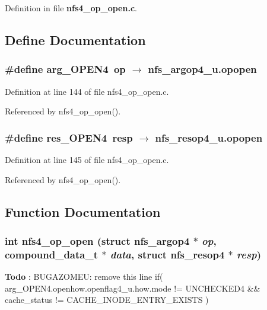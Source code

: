 Definition in file {\bf nfs4\_\-op\_\-open.c}.

\subsection{Define Documentation}
\subsubsection{\setlength{\rightskip}{0pt plus 5cm}\#define arg\_\-OPEN4\ op $\rightarrow$ nfs\_\-argop4\_\-u.opopen}\label{nfs4__op__open_8c_a0}




Definition at line 144 of file nfs4\_\-op\_\-open.c.

Referenced by nfs4\_\-op\_\-open().
\subsubsection{\setlength{\rightskip}{0pt plus 5cm}\#define res\_\-OPEN4\ resp $\rightarrow$ nfs\_\-resop4\_\-u.opopen}\label{nfs4__op__open_8c_a1}




Definition at line 145 of file nfs4\_\-op\_\-open.c.

Referenced by nfs4\_\-op\_\-open().

\subsection{Function Documentation}
\subsubsection{\setlength{\rightskip}{0pt plus 5cm}int nfs4\_\-op\_\-open (struct nfs\_\-argop4 $\ast$ {\em op}, compound\_\-data\_\-t $\ast$ {\em data}, struct nfs\_\-resop4 $\ast$ {\em resp})}\label{nfs4__op__open_8c_a4}


\begin{Desc}
\item[{\bf Todo}]: BUGAZOMEU: remove this line if( arg\_\-OPEN4.openhow.openflag4\_\-u.how.mode != UNCHECKED4 \&\& cache\_\-status != CACHE\_\-INODE\_\-ENTRY\_\-EXISTS )\end{Desc}


